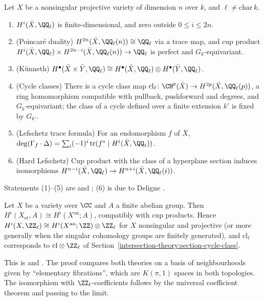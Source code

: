 \begin{theorem}\label{etale-cohomology:theorem-l-adic-properties}
Let $X$ be a nonsingular projective variety of dimension $n$ over $k$, and $\ell \neq \mathrm{char}\,k$.
\begin{enumerate}
\item $H^i(\bar X, \QQ_\ell)$ is finite-dimensional, and zero outside $0 \leq i \leq 2n$.
\item (Poincar\'e duality) $H^{2n}(\bar X, \QQ_\ell(n)) \cong \QQ_\ell$ via a trace map, and cup product
$H^i(\bar X, \QQ_\ell) \times H^{2n-i}(\bar X, \QQ_\ell(n)) \to \QQ_\ell$ is perfect and $G_k$-equivariant.
\item (K\"unneth) $H^\bullet(\bar X \times \bar Y, \QQ_\ell) \cong H^\bullet(\bar X, \QQ_\ell) \otimes H^\bullet(\bar Y, \QQ_\ell)$.
\item (Cycle classes) There is a cycle class map $\mathrm{cl}_\ell \colon \CH^p(\bar X) \to H^{2p}(\bar X, \QQ_\ell(p))$, a ring homomorphism compatible with pullback, pushforward and
degrees, and $G_k$-equivariant; the class of a cycle defined over a finite extension $k'$ is fixed by $G_{k'}$.
\item (Lefschetz trace formula) For an endomorphism $f$ of $\bar X$, $\deg(\Gamma_f \cdot \Delta) = \sum_i(-1)^i\operatorname{tr}(f^* \mid H^i(\bar X, \QQ_\ell))$.
\item (Hard Lefschetz) Cup product with the class of a hyperplane section induces isomorphisms $H^{n-i}(\bar X, \QQ_\ell) \to H^{n+i}(\bar X, \QQ_\ell(i))$.
\end{enumerate}
\end{theorem}

Statements (1)--(5) are \cite[Chapter VI]{milne-etale} and \cite{sga4-half}; (6) is due to Deligne \cite{deligne-weil-2}.

\begin{theorem}\label{etale-cohomology:theorem-comparison}
Let $X$ be a variety over $\CC$ and $A$ a finite abelian group. Then $H^i(X_{\mathrm{et}}, A) \cong H^i(X^{\mathrm{an}}; A)$, compatibly with cup products. Hence
$H^i(X, \ZZ_\ell) \cong H^i(X^{\mathrm{an}}; \ZZ) \otimes \ZZ_\ell$ for $X$ nonsingular and projective (or more generally when the singular cohomology groups are finitely generated), and
$\mathrm{cl}_\ell$ corresponds to $\mathrm{cl} \otimes \ZZ_\ell$ of Section~\ref{intersection-theory:section-cycle-class}.
\end{theorem}

This is \cite[Expos\'e XI, Th\'eor\`eme 4.4]{sga4-3} and \cite[Chapter III]{milne-etale}. The proof compares both theories on a basis of neighbourhoods given by
``elementary fibrations'', which are $K(\pi, 1)$ spaces in both topologies. The isomorphism with $\ZZ_\ell$-coefficients follows by the universal coefficient theorem and passing to
the limit.

